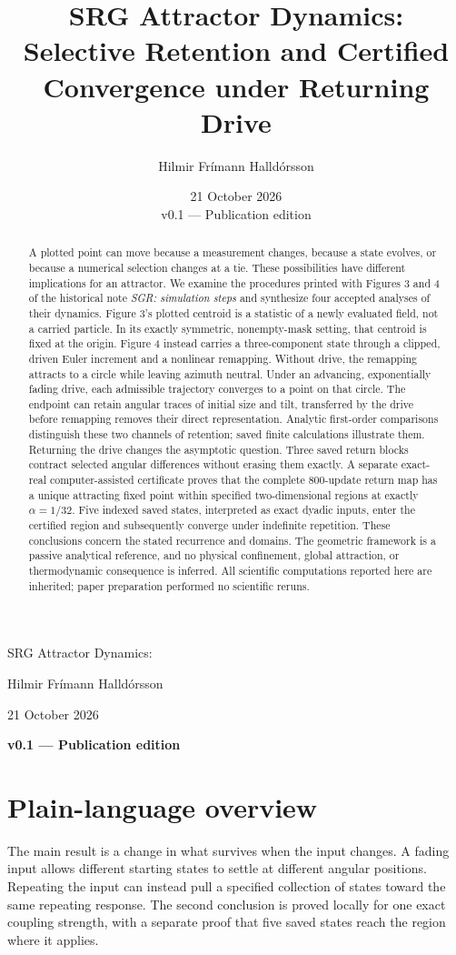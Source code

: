 \documentclass[11pt,a4paper]{article}
\title{SRG Attractor Dynamics:\\Selective Retention and Certified\\Convergence under Returning Drive}
\author{Hilmir Frímann Halldórsson}
\date{21 October 2026\\[6pt]\large v0.1 --- Publication edition}
\numberwithin{equation}{section}
\renewcommand{\maketitle}{\begin{center}
{\LARGE SRG Attractor Dynamics:\par}
\vspace{4mm}{\Large Selective Retention and Certified\par Convergence under Returning Drive\par}
\vspace{7mm}Hilmir Frímann Halldórsson\par
\vspace{4mm}21 October 2026\par
\vspace{4mm}\textbf{v0.1 --- Publication edition}\par
\end{center}\vspace{4mm}}
\begin{document}
\maketitle
\begin{abstract}
A plotted point can move because a measurement changes, because a state evolves, or because a numerical selection changes at a tie. These possibilities have different implications for an attractor. We examine the procedures printed with Figures 3 and 4 of the historical note \emph{SGR: simulation steps} and synthesize four accepted analyses of their dynamics. Figure 3's plotted centroid is a statistic of a newly evaluated field, not a carried particle. In its exactly symmetric, nonempty-mask setting, that centroid is fixed at the origin. Figure 4 instead carries a three-component state through a clipped, driven Euler increment and a nonlinear remapping. Without drive, the remapping attracts to a circle while leaving azimuth neutral. Under an advancing, exponentially fading drive, each admissible trajectory converges to a point on that circle. The endpoint can retain angular traces of initial size and tilt, transferred by the drive before remapping removes their direct representation. Analytic first-order comparisons distinguish these two channels of retention; saved finite calculations illustrate them. Returning the drive changes the asymptotic question. Three saved return blocks contract selected angular differences without erasing them exactly. A separate exact-real computer-assisted certificate proves that the complete 800-update return map has a unique attracting fixed point within specified two-dimensional regions at exactly $\alpha=1/32$. Five indexed saved states, interpreted as exact dyadic inputs, enter the certified region and subsequently converge under indefinite repetition. These conclusions concern the stated recurrence and domains. The geometric framework is a passive analytical reference, and no physical confinement, global attraction, or thermodynamic consequence is inferred. All scientific computations reported here are inherited; paper preparation performed no scientific reruns.
\end{abstract}
\clearpage
\section*{Plain-language overview}
The main result is a change in what survives when the input changes. A fading input allows different starting states to settle at different angular positions. Repeating the input can instead pull a specified collection of states toward the same repeating response. The second conclusion is proved locally for one exact coupling strength, with a separate proof that five saved states reach the region where it applies.
\end{document}
